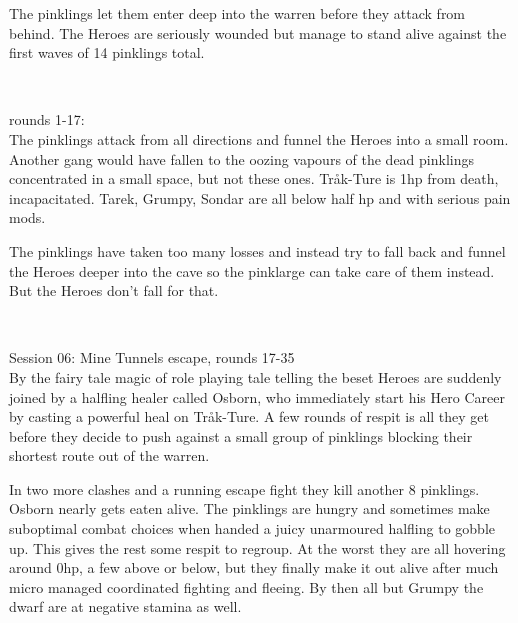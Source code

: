 The pinklings let them enter deep into the warren before they attack from behind. The Heroes are seriously wounded but manage to stand alive against the first waves of 14 pinklings total.

\

rounds 1-17:\\
The pinklings attack from all directions and funnel the Heroes into a small room. Another gang would have fallen to the oozing vapours of the dead pinklings concentrated in a small space, but not these ones. Tråk-Ture is 1hp from death, incapacitated. Tarek, Grumpy, Sondar are all below half hp and with serious pain mods.

The pinklings have taken too many losses and instead try to fall back and funnel the Heroes deeper into the cave so the pinklarge can take care of them instead. But the Heroes don't fall for that.

\

Session 06: Mine Tunnels escape, rounds 17-35\\                         %
By the fairy tale magic of role playing tale telling the beset Heroes are suddenly joined by a halfling healer called Osborn, who immediately start his Hero Career by casting a powerful heal on Tråk-Ture. A few rounds of respit is all they get before they decide to push against a small group of pinklings blocking their shortest route out of the warren.

In two more clashes and a running escape fight they kill another 8 pinklings. Osborn nearly gets eaten alive. The pinklings are hungry and sometimes make suboptimal combat choices when handed a juicy unarmoured halfling to gobble up. This gives the rest some respit to regroup. At the worst they are all hovering around 0hp, a few above or below, but they finally make it out alive after much micro managed coordinated fighting and fleeing. By then all but Grumpy the dwarf are at negative stamina as well.

